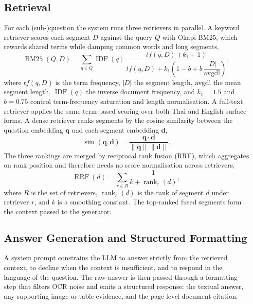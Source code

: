 \documentclass[10pt,a4paper,conference]{IEEEtran}
\begin{document}
\subsection{Retrieval}
For each (sub-)question the system runs three retrievers in parallel. A keyword
retriever scores each segment $D$ against the query $Q$ with Okapi BM25, which
rewards shared terms while damping common words and long segments,
{\small
\begin{equation}
\operatorname{BM25}(Q,D) = \sum_{q \in Q} \operatorname{IDF}(q)\,
\frac{tf(q,D)\,(k_1+1)}{tf(q,D) + k_1\!\left(1 - b + b\,\dfrac{|D|}{\mathrm{avgdl}}\right)},
\label{eq:bm25}
\end{equation}
}
where $tf(q,D)$ is the term frequency, $|D|$ the segment length, $\mathrm{avgdl}$
the mean segment length, $\operatorname{IDF}(q)$ the inverse document frequency,
and $k_1=1.5$ and $b=0.75$ control term-frequency saturation and length
normalisation. A full-text retriever applies the same term-based scoring over
both Thai and English surface forms. A dense retriever ranks segments by the
cosine similarity between the question embedding $\mathbf{q}$ and each segment
embedding $\mathbf{d}$,
{\small
\begin{equation}
\operatorname{sim}(\mathbf{q},\mathbf{d}) =
\frac{\mathbf{q}\cdot\mathbf{d}}{\lVert\mathbf{q}\rVert\,\lVert\mathbf{d}\rVert}.
\label{eq:cos}
\end{equation}
}
The three rankings are merged by reciprocal rank fusion (RRF), which aggregates
on rank position and therefore needs no score normalisation across retrievers,
{\small
\begin{equation}
\operatorname{RRF}(d) = \sum_{r \in R} \frac{1}{k + \operatorname{rank}_r(d)},
\label{eq:rrf}
\end{equation}
}
where $R$ is the set of retrievers, $\operatorname{rank}_r(d)$ is the rank of
segment $d$ under retriever $r$, and $k$ is a smoothing constant. The
top-ranked fused segments form the context passed to the generator.

\subsection{Answer Generation and Structured Formatting}
A system prompt constrains the LLM to answer strictly from the retrieved
context, to decline when the context is insufficient, and to respond in the
language of the question. The raw answer is then passed through a formatting
step that filters OCR noise and emits a structured response: the textual
answer, any supporting image or table evidence, and the page-level document
citation.
\end{document}
